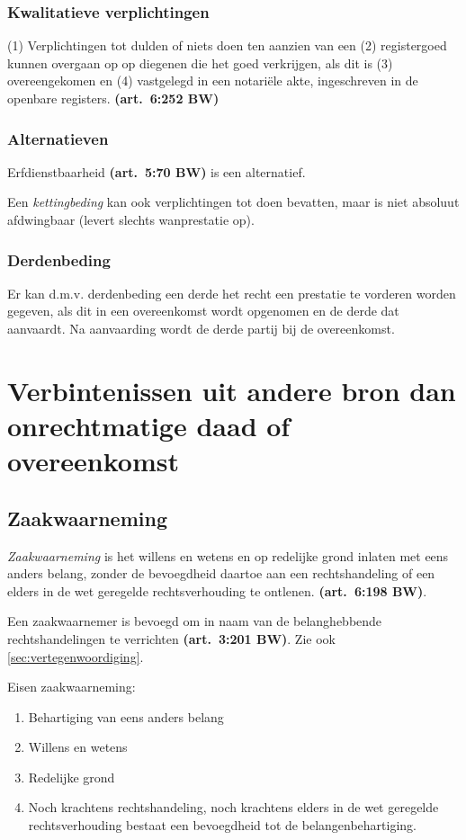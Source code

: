 \documentclass[a4paper]{article}
\newcommand{\art}[1]{\textbf{(art.~#1 BW)}\xspace}
\begin{document}
\subsubsection{Kwalitatieve verplichtingen}

(1) Verplichtingen tot dulden of niets doen ten aanzien van een (2)
registergoed kunnen overgaan op op diegenen die het goed verkrijgen, als dit
is (3) overeengekomen en (4) vastgelegd in een notariële akte, ingeschreven in
de openbare registers. \art{6:252}

\subsubsection{Alternatieven}

Erfdienstbaarheid \art{5:70} is een alternatief.

Een \emph{kettingbeding} kan ook verplichtingen tot doen bevatten, maar is
niet absoluut afdwingbaar (levert slechts wanprestatie op).

\subsubsection{Derdenbeding}

Er kan d.m.v. derdenbeding een derde het recht een prestatie te vorderen
worden gegeven, als dit in een overeenkomst wordt opgenomen en de derde dat
aanvaardt. Na aanvaarding wordt de derde partij bij de overeenkomst.


\section{Verbintenissen uit andere bron dan onrechtmatige daad of overeenkomst}

\subsection{Zaakwaarneming}

\emph{Zaakwaarneming} is het willens en wetens en op redelijke grond inlaten
met eens anders belang, zonder de bevoegdheid daartoe aan een rechtshandeling
of een elders in de wet geregelde rechtsverhouding te ontlenen. \art{6:198}.

Een zaakwaarnemer is bevoegd om in naam van de belanghebbende
rechtshandelingen te verrichten \art{3:201}. Zie ook
\ref{sec:vertegenwoordiging}.

Eisen zaakwaarneming:
\begin{enumerate}
  \item Behartiging van eens anders belang
  \item Willens en wetens
  \item Redelijke grond
  \item Noch krachtens rechtshandeling, noch krachtens elders in de wet
    geregelde rechtsverhouding bestaat een bevoegdheid tot de
    belangenbehartiging.
\end{enumerate}
\end{document}
